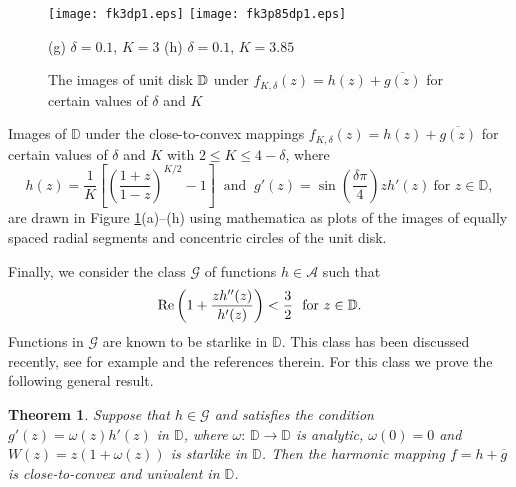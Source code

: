 \documentclass[a4paper,12pt]{amsart}
\newtheorem{thm}{Theorem}
\theoremstyle{definition}
\newcounter {own}
\begin{document}
\begin{figure}
\begin{center}
\texttt{[image: fk3dp1.eps]}
\hspace{1cm}
\texttt{[image: fk3p85dp1.eps]}
\end{center}
(g) $\delta = 0.1 $, $K= 3$ \hspace{5cm} (h) $\delta = 0.1$, $K =3.85 $
\caption{The images of unit disk $\protect {{\mathbb D}}$ under $f_{K,\delta}(z)=h(z)+\overline{g(z)}$ for certain values of $\delta$ and $K$
\label{fig2}}
\end{figure}

Images of $\mathbb{D}$ under the close-to-convex mappings $f_{K,\delta}(z)=h(z)+\overline{g(z)}$ for certain values of $\delta$ and $K$
with $2\leq K\leq 4-\delta $, where
$$ h(z)=\frac{1}{K}\left[ \left(\frac{1+z}{1-z}\right)^{K/2} - 1 \right] ~\mbox{ and }~ g'(z)=\sin\left(\frac{\delta \pi}{4}\right)zh'(z) ~\mbox{for $z\in{{\mathbb D}}$},
$$
are drawn in Figure \ref{fig2}(a)--(h) using mathematica as plots of the images of equally spaced
radial segments and concentric circles of the unit disk.

Finally, we consider the class $ \mathcal{G}$ of functions $h\in {\mathcal A}$ such that
\begin{equation}\label{cl-G}
{\rm Re } \left( 1+\frac{zh''(z)}{h'(z)}\right) < \frac{3}{2} ~\mbox{ for $z\in {{\mathbb D}}$}.
\end{equation}
Functions in $\mathcal{G}$ are known to be starlike in ${{\mathbb D}}$. This class has been discussed recently, see for
example \cite{OPW13-SMJ} and the references therein. For this class we prove the following general result.

\begin{thm}\label{AP-Theorem5}
Suppose that $h\in\mathcal{G}$ and satisfies the condition $ g'(z)=\omega (z) h'(z)$ in ${{\mathbb D}}$, where
$\omega :\,{{\mathbb D}} \rightarrow {{\mathbb D}}$ is analytic, $\omega (0)=0$ and $W(z)=z(1+\omega (z))$ is starlike in ${{\mathbb D}}$.
Then the harmonic mapping $f=h+\overline{g}$ is close-to-convex and univalent in ${{\mathbb D}}$.
\end{thm}
\end{document}
